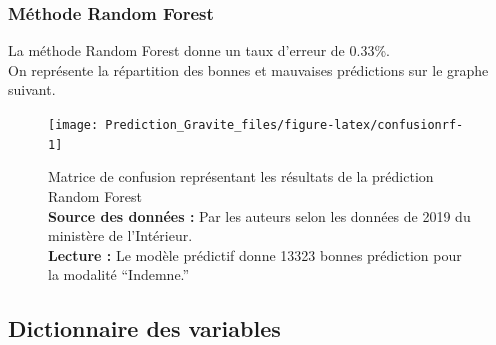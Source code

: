 \documentclass[french,]{tp}
\begin{document}
\newpage

\hypertarget{muxe9thode-random-forest}{%
\subsubsection{Méthode Random Forest}\label{muxe9thode-random-forest}}

La méthode Random Forest donne un taux d'erreur de 0.33\%.\\
On représente la répartition des bonnes et mauvaises prédictions sur le graphe suivant.

\begin{figure}[ht!]

{\centering \texttt{[image: Prediction\_Gravite\_files/figure-latex/confusionrf-1]} 

}

\caption{Matrice de confusion représentant les résultats de la prédiction Random Forest\\
\textbf{Source des données :} Par les auteurs selon les données de 2019 du ministère de l'Intérieur.\\
\textbf{Lecture :} Le modèle prédictif donne 13323 bonnes prédiction pour la modalité ``Indemne.''}\label{fig:confusionrf}
\end{figure}





\newpage

\hypertarget{dictionnaire-des-variables}{%
\subsection{Dictionnaire des variables}\label{dictionnaire-des-variables}}
\end{document}
